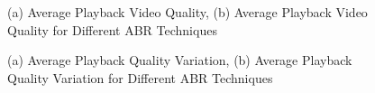 \documentclass[journal,10pt]{IEEEtran}
\begin{document}
\begin{figure}
	\captionsetup[subfigure]{}
	\begin{center}
	\end{center}
	\caption{(a) Average Playback Video Quality, (b) Average Playback Video Quality for Different ABR Techniques}
\end{figure}

\begin{figure}
	\captionsetup[subfigure]{}
	\begin{center}
	\end{center}
	\caption{(a) Average Playback Quality Variation, (b) Average Playback Quality Variation for Different ABR Techniques}
\end{figure}
\end{document}
